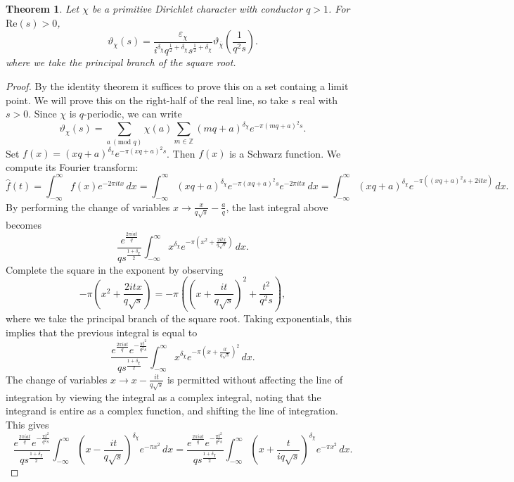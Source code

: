 \documentclass[12pt]{book}
\newtheorem{theorem}{Theorem}[section]
\theoremstyle{definition}\newframedtheorem{method}{Method}
\newcommand{\tmod}[1]{\ \left(\text{mod }#1\right)}
\newcommand{\Z}{\mathbb{Z}}
\renewcommand{\d}{\delta}
\newcommand{\e}{\varepsilon}
\newcommand{\vt}{\vartheta}
\newcommand{\<}{\langle}
\renewcommand{\>}{\rangle}
\newcommand{\conj}{\overline}
\newcommand{\cchi}{\conj{\chi}}
\renewcommand{\Re}{\mathrm{Re}}
\begin{document}
      \begin{theorem}
        Let $\chi$ be a primitive Dirichlet character with conductor $q > 1$. For $\Re(s) > 0$,
        \[
          \vt_{\chi}(s) = \frac{\e_{\chi}}{i^{\d_{\chi}}q^{\frac{1}{2}+\d_{\chi}}s^{\frac{1}{2}+\d_{\chi}}}\vt_{\cchi}\left(\frac{1}{q^{2}s}\right).
        \]
        where we take the principal branch of the square root.
      \end{theorem}
      \begin{proof}
        By the identity theorem it suffices to prove this on a set containg a limit point. We will prove this on the right-half of the real line, so take $s$ real with $s > 0$. Since $\chi$ is $q$-periodic, we can write
        \[
          \vt_{\chi}(s) = \sum_{a \tmod{q}}\chi(a)\sum_{m \in \Z}(mq+a)^{\d_{\chi}}e^{-\pi(mq+a)^{2}s}.
        \]
        Set $f(x) = (xq+a)^{\d_{\chi}}e^{-\pi(xq+a)^{2}s}$. Then $f(x)$ is a Schwarz function. We compute its Fourier transform:
        \[
          \hat{f}(t) = \int_{-\infty}^{\infty}f(x)e^{-2\pi itx}\,dx = \int_{-\infty}^{\infty}(xq+a)^{\d_{\chi}}e^{-\pi(xq+a)^{2}s}e^{-2\pi itx}\,dx = \int_{-\infty}^{\infty}(xq+a)^{\d_{\chi}}e^{-\pi((xq+a)^{2}s+2itx)}\,dx.
        \]
        By performing the change of variables $x \to \frac{x}{q\sqrt{s}}-\frac{a}{q}$, the last integral above becomes
        \[
          \frac{e^{\frac{2\pi iat}{q}}}{qs^{\frac{1+\d_{\chi}}{2}}}\int_{-\infty}^{\infty}x^{\d_{\chi}}e^{-\pi\left(x^{2}+\frac{2itx}{q\sqrt{s}}\right)}\,dx.
        \]
        Complete the square in the exponent by observing
        \[
          -\pi\left(x^{2}+\frac{2itx}{q\sqrt{s}}\right) = -\pi\left(\left(x+\frac{it}{q\sqrt{s}}\right)^{2}+\frac{t^{2}}{q^{2}s}\right),
        \]
        where we take the principal branch of the square root. Taking exponentials, this implies that the previous integral is equal to
        \[
          \frac{e^{\frac{2\pi iat}{q}}e^{-\frac{\pi t^{2}}{q^{2}s}}}{qs^{\frac{1+\d_{\chi}}{2}}}\int_{-\infty}^{\infty}x^{\d_{\chi}}e^{-\pi\left(x+\frac{it}{q\sqrt{s}}\right)^{2}}\,dx.
        \]
        The change of variables $x \to x-\frac{it}{q\sqrt{s}}$ is permitted without affecting the line of integration by viewing the integral as a complex integral, noting that the integrand is entire as a complex function, and shifting the line of integration. This gives
        \[
          \frac{e^{\frac{2\pi iat}{q}}e^{-\frac{\pi t^{2}}{q^{2}s}}}{qs^{\frac{1+\d_{\chi}}{2}}}\int_{-\infty}^{\infty}\left(x-\frac{it}{q\sqrt{s}}\right)^{\d_{\chi}}e^{-\pi x^{2}}\,dx = \frac{e^{\frac{2\pi iat}{q}}e^{-\frac{\pi t^{2}}{q^{2}s}}}{qs^{\frac{1+\d_{\chi}}{2}}}\int_{-\infty}^{\infty}\left(x+\frac{t}{iq\sqrt{s}}\right)^{\d_{\chi}}e^{-\pi x^{2}}\,dx.
\]
\end{proof}
\end{document}
